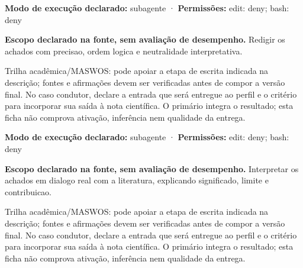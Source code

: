 \begin{arquitetura}
\textbf{Modo de execução declarado:} subagente · \textbf{Permissões:} edit: deny; bash: deny
\end{arquitetura}


\begin{descricao}
\textbf{Escopo declarado na fonte, sem avaliação de desempenho.}
Redigir os achados com precisao, ordem logica e neutralidade interpretativa.
\end{descricao}

\begin{funcao}
Trilha acadêmica/MASWOS: pode apoiar a etapa de escrita indicada na descrição; fontes e afirmações devem ser verificadas antes de compor a versão final. No caso condutor, declare a entrada que será entregue ao perfil e o critério para incorporar sua saída à nota científica. O primário integra o resultado; esta ficha não comprova ativação, inferência nem qualidade da entrega.
\end{funcao}

\begin{arquitetura}
\textbf{Modo de execução declarado:} subagente · \textbf{Permissões:} edit: deny; bash: deny
\end{arquitetura}


\begin{descricao}
\textbf{Escopo declarado na fonte, sem avaliação de desempenho.}
Interpretar os achados em dialogo real com a literatura, explicando significado, limite e contribuicao.
\end{descricao}

\begin{funcao}
Trilha acadêmica/MASWOS: pode apoiar a etapa de escrita indicada na descrição; fontes e afirmações devem ser verificadas antes de compor a versão final. No caso condutor, declare a entrada que será entregue ao perfil e o critério para incorporar sua saída à nota científica. O primário integra o resultado; esta ficha não comprova ativação, inferência nem qualidade da entrega.
\end{funcao}

